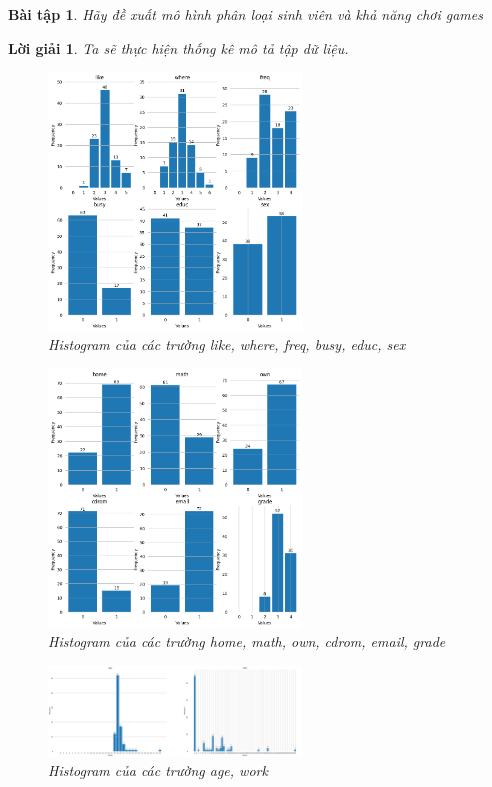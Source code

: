 \documentclass[14pt, a4paper]{article}
\theoremstyle{sltheorem}
\newtheorem{baitap}{Bài tập}
\theoremstyle{soltheorem}
\newtheorem*{loigiai}{Lời giải}
\begin{document}
\begin{baitap}
    Hãy đề xuất mô hình phân loại sinh viên và khả năng chơi games
\end{baitap}

\begin{loigiai}
    Ta sẽ thực hiện thống kê mô tả tập dữ liệu.

    \begin{figure}[h!]
        \centering
        \includegraphics[width=0.6\textwidth]{1.png}
        \caption{Histogram của các trường like, where, freq, busy, educ, sex}
        \label{fig:1}
    \end{figure}

    \begin{figure}[h!]
        \centering
        \includegraphics[width=0.6\textwidth]{2.png}
        \caption{Histogram của các trường home, math, own, cdrom, email, grade}
        \label{fig:2}
    \end{figure}

    \begin{figure}[h!]
        \centering
        \includegraphics[width=0.6\textwidth]{3.png}
        \caption{Histogram của các trường age, work}
        \label{fig:3}
    \end{figure}


\end{loigiai}
\end{document}
